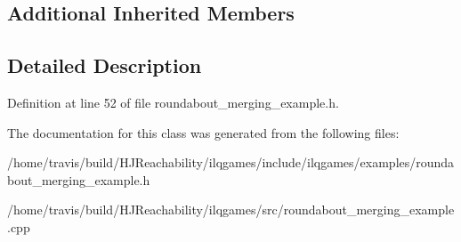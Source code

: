 \subsection*{Additional Inherited Members}


\subsection{Detailed Description}


Definition at line 52 of file roundabout\+\_\+merging\+\_\+example.\+h.



The documentation for this class was generated from the following files\+:\begin{DoxyCompactItemize}
\item 
/home/travis/build/\+H\+J\+Reachability/ilqgames/include/ilqgames/examples/roundabout\+\_\+merging\+\_\+example.\+h\item 
/home/travis/build/\+H\+J\+Reachability/ilqgames/src/roundabout\+\_\+merging\+\_\+example.\+cpp\end{DoxyCompactItemize}
